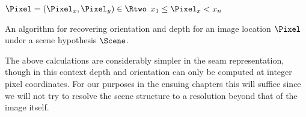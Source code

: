 \begin{algorithm}[tb]
  \label{alg:comuting-from-scene}
        \begin{algorithmic}
          \REQUIRE $\Pixel=(\Pixel_x,\Pixel_y)\in\Rtwo$
          \REQUIRE $x_1 \leq \Pixel_x < x_n$
              \STATE{}
              \ELSE
              \ENDIF
              \RETURN
            \ENDIF
          \ENDFOR
        \end{algorithmic}
  \caption{An algorithm for recovering orientation and depth for an
    image location $\Pixel$ under a scene hypothesis $\Scene$.}
\end{algorithm}

The above calculations are considerably simpler in the seam
representation, though in this context depth and orientation can only
be computed at integer pixel coordinates. For our purposes in the
ensuing chapters this will suffice since we will not try to resolve
the scene structure to a resolution beyond that of the image itself.

